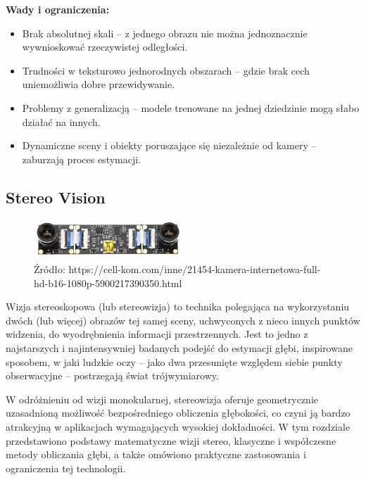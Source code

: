 \documentclass[magisterska]{pracadypl}
\begin{document}
\begin{minipage}[t]{\textwidth}
\textbf{Wady i ograniczenia:}
\begin{itemize}
  \item Brak absolutnej skali – z jednego obrazu nie można jednoznacznie wywnioskować rzeczywistej odległości.

  \item Trudności w teksturowo jednorodnych obszarach – gdzie brak cech uniemożliwia dobre przewidywanie.

  \item Problemy z generalizacją – modele trenowane na jednej dziedzinie mogą słabo działać na innych.

  \item Dynamiczne sceny i obiekty poruszające się niezależnie od kamery – zaburzają proces estymacji.
\end{itemize}
\end{minipage}

\subsection{Stereo Vision}

\begin{figure}[h]  %
    \centering  %
    \includegraphics[width=0.5\textwidth]{images/MAINSTEREO.png}  %
    \captionsetup{labelformat=empty, font=footnotesize}
    \caption{Źródło: https://cell-kom.com/inne/21454-kamera-internetowa-full-hd-b16-1080p-5900217390350.html}
    \label{fig:mono}  %
\end{figure}

Wizja stereoskopowa (lub stereowizja) to technika polegająca na wykorzystaniu dwóch (lub więcej) obrazów tej samej sceny, uchwyconych z nieco innych punktów widzenia, do wyodrębnienia informacji przestrzennych. Jest to jedno z najstarszych i najintensywniej badanych podejść do estymacji głębi, inspirowane sposobem, w jaki ludzkie oczy – jako dwa przesunięte względem siebie punkty obserwacyjne – postrzegają świat trójwymiarowy.

W odróżnieniu od wizji monokularnej, stereowizja oferuje geometrycznie uzasadnioną możliwość bezpośredniego obliczenia głębokości, co czyni ją bardzo atrakcyjną w aplikacjach wymagających wysokiej dokładności. W tym rozdziale przedstawiono podstawy matematyczne wizji stereo, klasyczne i współczesne metody obliczania głębi, a także omówiono praktyczne zastosowania i ograniczenia tej technologii.
\end{document}
